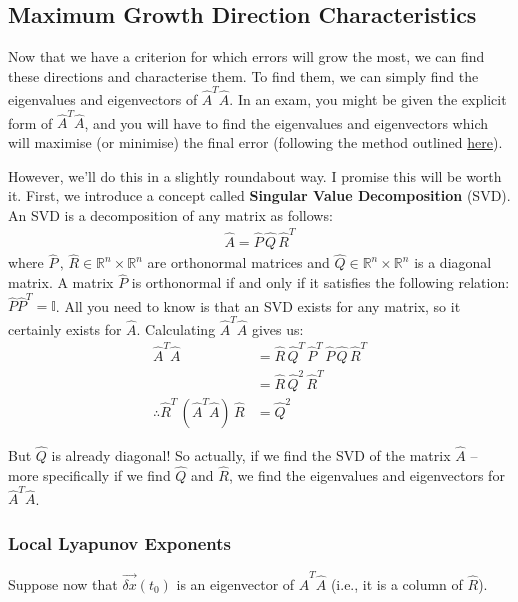 \subsection{Maximum Growth Direction Characteristics}

Now that we have a criterion for which errors will grow the most, we can find these directions and characterise them. To find them, we can simply find the eigenvalues and eigenvectors of $\hat{A}^T\hat{A}$. In an exam, you might be given the explicit form of $\hat{A}^T\hat{A}$, and you will have to find the eigenvalues and eigenvectors which will maximise (or minimise) the final error (following the method outlined \hyperref[Lin Alg]{here}).

However, we'll do this in a slightly roundabout way. I promise this will be worth it. First, we introduce a concept called \textbf{Singular Value Decomposition} (SVD). An SVD is a decomposition of any matrix as follows:
\begin{align*}
    \hat{A} = \hat{P}\, \hat{Q}\, \hat{R}^T
\end{align*}
where $\hat{P}\,,\,\hat{R}\in \mathbb{R}^n \times \mathbb{R}^n$ are orthonormal matrices and $\hat{Q}\in \mathbb{R}^n \times \mathbb{R}^n$ is a diagonal matrix. A matrix $\hat{P}$ is orthonormal if and only if it satisfies the following relation: $\hat{P}\hat{P}^T=\mathbb{I}$. All you need to know is that an SVD exists for any matrix, so it certainly exists for $\hat{A}$. Calculating $\hat{A}^T\hat{A}$ gives us:
\begin{align*}
    \hat{A}^T\hat{A}
    &=
    \hat{R}\,\hat{Q}^T\,\hat{P}^T\, \hat{P}\,\hat{Q}\,\hat{R}^T
    \\
    &=
    \hat{R}\,\hat{Q}^2\,\hat{R}^T
    \\
    \therefore
    \hat{R}^T \, \left( \hat{A}^T\hat{A} \right)\,\hat{R}
    &=
    \hat{Q}^2
\end{align*}

But $\hat{Q}$ is already diagonal! So actually, if we find the SVD of the matrix $\hat{A}$ – more specifically if we find $\hat{Q}$ and $\hat{R}$, we find the eigenvalues and eigenvectors for $\hat{A}^T\hat{A}$. 

\subsubsection{Local Lyapunov Exponents}

Suppose now that $\vec{\delta x}(t_0)$ is an eigenvector of $\hat{A}^T\hat{A}$ (i.e., it is a column of $\hat{R}$). 

